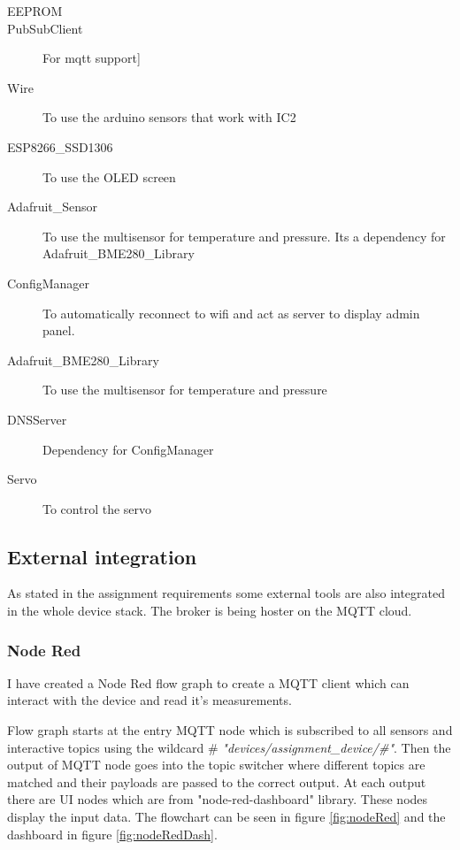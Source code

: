 \documentclass[11pt,a4paper]{article}
\begin{document}
\begin{description}
\item[EEPROM]
\item[PubSubClient] For mqtt support]
\item[Wire] To use the arduino sensors that work with IC2
\item[ESP8266\_SSD1306] To use the OLED screen
\item[Adafruit\_Sensor] To use the multisensor for temperature and pressure. Its a dependency for Adafruit\_BME280\_Library
\item[ConfigManager] To automatically reconnect to wifi and act as server to display admin panel.
\item[Adafruit\_BME280\_Library]To use the multisensor for temperature and pressure
\item[DNSServer] Dependency for ConfigManager
\item[Servo] To control the servo
\end{description}


\subsection{External integration}
As stated in the assignment requirements some external tools are also integrated in the whole device stack. The broker is being hoster on the MQTT cloud.

\subsubsection{Node Red}
I have created a Node Red flow graph to create a MQTT client which can interact with the device and read it's measurements.\bigskip

Flow graph starts at the entry MQTT node which is subscribed to all sensors and interactive topics using the wildcard \# \textit{"devices/assignment\_device/\#"}. Then the output of MQTT node goes into the topic switcher where different topics are matched and their payloads are passed to the correct output. At each output there are UI nodes which are from "node-red-dashboard" library. These nodes display the input data. The flowchart can be seen in figure \ref{fig:nodeRed} and the dashboard in figure \ref{fig:nodeRedDash}.
\end{document}
